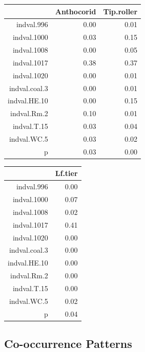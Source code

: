 \documentclass[12pt]{article}
\begin{document}
\begin{table}[ht]
\begin{center}
\begin{tabular}{rrr}
  \hline
 & Anthocorid & Tip.roller \\ 
  \hline
indval.996 & 0.00 & 0.01 \\ 
  indval.1000 & 0.03 & 0.15 \\ 
  indval.1008 & 0.00 & 0.05 \\ 
  indval.1017 & 0.38 & 0.37 \\ 
  indval.1020 & 0.00 & 0.01 \\ 
  indval.coal.3 & 0.00 & 0.01 \\ 
  indval.HE.10 & 0.00 & 0.15 \\ 
  indval.Rm.2 & 0.10 & 0.01 \\ 
  indval.T.15 & 0.03 & 0.04 \\ 
  indval.WC.5 & 0.03 & 0.02 \\ 
  p & 0.03 & 0.00 \\ 
   \hline
\end{tabular}
\end{center}
\end{table}%
\begin{table}[ht]
\begin{center}
\begin{tabular}{rr}
  \hline
 & Lf.tier \\ 
  \hline
indval.996 & 0.00 \\ 
  indval.1000 & 0.07 \\ 
  indval.1008 & 0.02 \\ 
  indval.1017 & 0.41 \\ 
  indval.1020 & 0.00 \\ 
  indval.coal.3 & 0.00 \\ 
  indval.HE.10 & 0.00 \\ 
  indval.Rm.2 & 0.00 \\ 
  indval.T.15 & 0.00 \\ 
  indval.WC.5 & 0.02 \\ 
  p & 0.04 \\ 
   \hline
\end{tabular}
\end{center}
\end{table}
\subsection{Co-occurrence Patterns}
\end{document}
